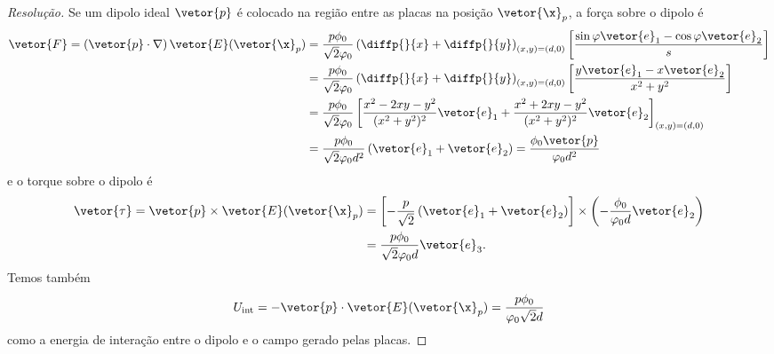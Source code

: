 \begin{proof}[Resolução]
    Se um dipolo ideal \(\vetor{p}\) é colocado na região entre as placas na posição \(\vetor{\x}_p\), a força sobre o dipolo é
    \begin{align*}
        \vetor{F} = \left(\vetor{p}\cdot \nabla\right)\vetor{E}(\vetor{\x}_p)
        &= \frac{p\phi_0}{\sqrt{2}\varphi_0}\left(\diffp{}{x} + \diffp{}{y}\right)_{(x,y) = (d,0)}\left[\frac{\sin\varphi \vetor{e}_1 - \cos\varphi\vetor{e}_2}{s}\right]\\
        &=\frac{p\phi_0}{\sqrt{2}\varphi_0}\left(\diffp{}{x} + \diffp{}{y}\right)_{(x,y)=(d,0)}\left[\frac{y \vetor{e}_1 - x\vetor{e}_2}{x^2 + y^2}\right]\\
        &=  \frac{p \phi_0}{\sqrt{2}\varphi_0} \left[\frac{x^2 - 2xy - y^2}{(x^2 + y^2)^2}\vetor{e}_1 + \frac{x^2 + 2xy - y^2}{(x^2 + y^2)^2}\vetor{e}_2\right]_{(x,y) = (d,0)}\\
        &=  \frac{p \phi_0}{\sqrt{2} \varphi_0d^2}\left(\vetor{e}_1 + \vetor{e}_2\right) = \frac{\phi_0\vetor{p}}{\varphi_0 d^2}
    \end{align*}
    e o torque sobre o dipolo é
    \begin{align*}
        \vetor{\tau} = \vetor{p} \times \vetor{E}(\vetor{\x}_p) &= \left[-\frac{p}{\sqrt{2}}\left(\vetor{e}_1 + \vetor{e}_2\right)\right] \times \left(-\frac{\phi_0}{\varphi_0 d}\vetor{e}_2\right)\\
                                                                &= \frac{p\phi_0}{\sqrt{2} \varphi_0 d}\vetor{e}_3.
    \end{align*}
    Temos também
    \begin{equation*}
        U_\mathrm{int} = - \vetor{p} \cdot \vetor{E}(\vetor{\x}_p) = \frac{p\phi_0}{\varphi_0\sqrt{2}d}
    \end{equation*}
    como a energia de interação entre o dipolo e o campo gerado pelas placas.
\end{proof}
